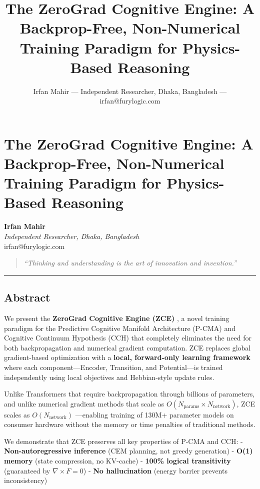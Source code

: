 \documentclass[
  11pt,
  a4paper,
]{article}
\title{The ZeroGrad Cognitive Engine: A Backprop-Free, Non-Numerical
Training Paradigm for Physics-Based Reasoning}
\author{Irfan Mahir --- Independent Researcher, Dhaka, Bangladesh ---
irfan@furylogic.com}
\date{}
\begin{document}
\maketitle

{
\hypersetup{linkcolor=}
\setcounter{tocdepth}{3}
\tableofcontents
}
\section{The ZeroGrad Cognitive Engine: A Backprop-Free, Non-Numerical
Training Paradigm for Physics-Based
Reasoning}\label{the-zerograd-cognitive-engine-a-backprop-free-non-numerical-training-paradigm-for-physics-based-reasoning}

\textbf{Irfan Mahir}\\
\emph{Independent Researcher, Dhaka, Bangladesh}\\
irfan@furylogic.com

\begin{quote}
\emph{``Thinking and understanding is the art of innovation and
invention.''}
\end{quote}

\begin{center}\rule{0.5\linewidth}{0.5pt}\end{center}

\subsection{Abstract}\label{abstract}

We present the \textbf{ZeroGrad Cognitive Engine (ZCE)} , a novel
training paradigm for the Predictive Cognitive Manifold Architecture
(P-CMA) and Cognitive Continuum Hypothesis (CCH) that completely
eliminates the need for both backpropagation and numerical gradient
computation. ZCE replaces global gradient-based optimization with a
\textbf{local, forward-only learning framework} where each
component---Encoder, Transition, and Potential---is trained
independently using local objectives and Hebbian-style update rules.

Unlike Transformers that require backpropagation through billions of
parameters, and unlike numerical gradient methods that scale as
\(O(N_{\text{params}} \times N_{\text{network}})\), ZCE scales as
\textbf{\(O(N_{\text{network}})\)} ---enabling training of 130M+
parameter models on consumer hardware without the memory or time
penalties of traditional methods.

We demonstrate that ZCE preserves all key properties of P-CMA and CCH: -
\textbf{Non-autoregressive inference} (CEM planning, not greedy
generation) - \textbf{O(1) memory} (state compression, no KV-cache) -
\textbf{100\% logical transitivity} (guaranteed by
\(\nabla \times F = 0\)) - \textbf{No hallucination} (energy barrier
prevents inconsistency)
\end{document}
